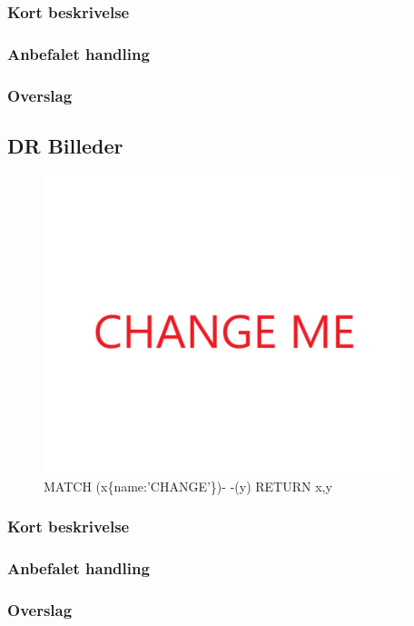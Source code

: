 \documentclass{article}
\begin{document}
\subsubsection{Kort beskrivelse}
\subsubsection{Anbefalet handling}
\subsubsection{Overslag}
\newpage{}
\clearpage
\subsection{DR Billeder}
\begin{figure}[h]
\includegraphics[width=300pt]{CHANGE.PNG}
\caption{MATCH (x\{name:'CHANGE'\})- -(y) RETURN x,y}
\end{figure}
\subsubsection{Kort beskrivelse}
\subsubsection{Anbefalet handling}
\subsubsection{Overslag}
\end{document}
